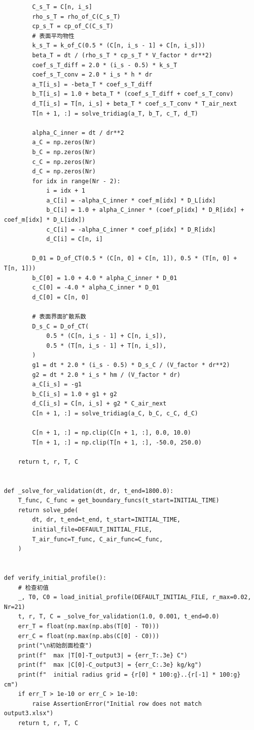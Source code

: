 \documentclass[withoutpreface,bwprint]{cumcm_thesis}
\begin{document}
\begin{appendices}
\begin{lstlisting}
        C_s_T = C[n, i_s]
        rho_s_T = rho_of_C(C_s_T)
        cp_s_T = cp_of_C(C_s_T)
        # 表面平均物性
        k_s_T = k_of_C(0.5 * (C[n, i_s - 1] + C[n, i_s]))
        beta_T = dt / (rho_s_T * cp_s_T * V_factor * dr**2)
        coef_s_T_diff = 2.0 * (i_s - 0.5) * k_s_T
        coef_s_T_conv = 2.0 * i_s * h * dr
        a_T[i_s] = -beta_T * coef_s_T_diff
        b_T[i_s] = 1.0 + beta_T * (coef_s_T_diff + coef_s_T_conv)
        d_T[i_s] = T[n, i_s] + beta_T * coef_s_T_conv * T_air_next
        T[n + 1, :] = solve_tridiag(a_T, b_T, c_T, d_T)

        alpha_C_inner = dt / dr**2
        a_C = np.zeros(Nr)
        b_C = np.zeros(Nr)
        c_C = np.zeros(Nr)
        d_C = np.zeros(Nr)
        for idx in range(Nr - 2):
            i = idx + 1
            a_C[i] = -alpha_C_inner * coef_m[idx] * D_L[idx]
            b_C[i] = 1.0 + alpha_C_inner * (coef_p[idx] * D_R[idx] + coef_m[idx] * D_L[idx])
            c_C[i] = -alpha_C_inner * coef_p[idx] * D_R[idx]
            d_C[i] = C[n, i]

        D_01 = D_of_CT(0.5 * (C[n, 0] + C[n, 1]), 0.5 * (T[n, 0] + T[n, 1]))
        b_C[0] = 1.0 + 4.0 * alpha_C_inner * D_01
        c_C[0] = -4.0 * alpha_C_inner * D_01
        d_C[0] = C[n, 0]

        # 表面界面扩散系数
        D_s_C = D_of_CT(
            0.5 * (C[n, i_s - 1] + C[n, i_s]),
            0.5 * (T[n, i_s - 1] + T[n, i_s]),
        )
        g1 = dt * 2.0 * (i_s - 0.5) * D_s_C / (V_factor * dr**2)
        g2 = dt * 2.0 * i_s * hm / (V_factor * dr)
        a_C[i_s] = -g1
        b_C[i_s] = 1.0 + g1 + g2
        d_C[i_s] = C[n, i_s] + g2 * C_air_next
        C[n + 1, :] = solve_tridiag(a_C, b_C, c_C, d_C)

        C[n + 1, :] = np.clip(C[n + 1, :], 0.0, 10.0)
        T[n + 1, :] = np.clip(T[n + 1, :], -50.0, 250.0)

    return t, r, T, C


def _solve_for_validation(dt, dr, t_end=1800.0):
    T_func, C_func = get_boundary_funcs(t_start=INITIAL_TIME)
    return solve_pde(
        dt, dr, t_end=t_end, t_start=INITIAL_TIME,
        initial_file=DEFAULT_INITIAL_FILE,
        T_air_func=T_func, C_air_func=C_func,
    )


def verify_initial_profile():
    # 检查初值
    _, T0, C0 = load_initial_profile(DEFAULT_INITIAL_FILE, r_max=0.02, Nr=21)
    t, r, T, C = _solve_for_validation(1.0, 0.001, t_end=0.0)
    err_T = float(np.max(np.abs(T[0] - T0)))
    err_C = float(np.max(np.abs(C[0] - C0)))
    print("\n初始剖面检查")
    print(f"  max |T[0]-T_output3| = {err_T:.3e} C")
    print(f"  max |C[0]-C_output3| = {err_C:.3e} kg/kg")
    print(f"  initial radius grid = {r[0] * 100:g}..{r[-1] * 100:g} cm")
    if err_T > 1e-10 or err_C > 1e-10:
        raise AssertionError("Initial row does not match output3.xlsx")
    return t, r, T, C



\end{lstlisting}
\end{appendices}
\end{document}
